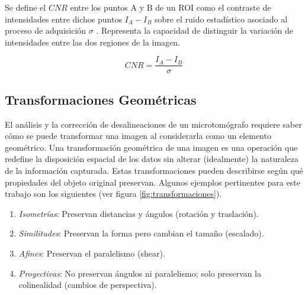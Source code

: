 Se define el $CNR$ entre los puntos A y B de un ROI como el contraste de
intensidades entre dichos puntos $I_A - I_B$ sobre el ruido estadístico asociado
al proceso de adquisición $\sigma$ \cite{Bushberg}. Representa la
capacidad de distinguir la variación de intensidades entre las dos regiones de
la imagen.

\begin{equation}
    CNR = \frac{I_A - I_B}{\sigma}
    \label{eq:CNR}
\end{equation}

\subsection{Transformaciones Geométricas}

El análisis y la corrección de desalineaciones de un microtomógrafo requiere saber cómo se
puede transformar una imagen al considerarla como un elemento geométrico. Una 
transformación geométrica de una imagen es una operación que redefine la
disposición espacial de los datos sin alterar (idealmente) la naturaleza de la
información capturada. Estas transformaciones pueden describirse según qué propiedades del objeto original
preservan. Algunos ejemplos pertinentes para este trabajo son los siguientes (ver
figura \ref{fig:transformaciones}).

\begin{enumerate}[label=\alph*)]
    \item \textit{Isometrías}: Preservan distancias y ángulos (rotación y traslación).
    \item \textit{Similitudes}: Preservan la forma pero cambian el tamaño (escalado).
    \item \textit{Afines}: Preservan el paralelismo (shear).
    \item \textit{Proyectivas}: No preservan ángulos ni paralelismo; solo preservan la
    colinealidad (cambios de perspectiva).
\end{enumerate}

